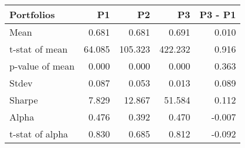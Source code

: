\begin{tabular}{lrrrr}
\toprule
Portfolios & P1 & P2 & P3 & P3 - P1 \\
\midrule
Mean & 0.681 & 0.681 & 0.691 & 0.010 \\
t-stat of mean & 64.085 & 105.323 & 422.232 & 0.916 \\
p-value of mean & 0.000 & 0.000 & 0.000 & 0.363 \\
Stdev & 0.087 & 0.053 & 0.013 & 0.089 \\
Sharpe & 7.829 & 12.867 & 51.584 & 0.112 \\
Alpha & 0.476 & 0.392 & 0.470 & -0.007 \\
t-stat of alpha & 0.830 & 0.685 & 0.812 & -0.092 \\
\bottomrule
\end{tabular}
